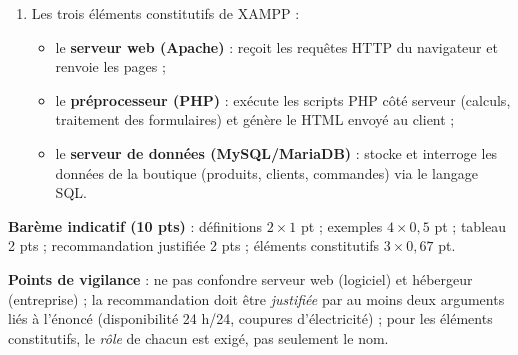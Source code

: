 \documentclass[11pt]{article}
\begin{document}
\begin{corrige}
\begin{enumerate}
\begin{itemize}
\item un hébergeur professionnel garantit une \textbf{bande passante suffisante}, une adresse IP fixe, un nom de domaine et une \textbf{sécurité} (pare-feu, sauvegardes, certificat HTTPS) difficiles à mettre en œuvre localement par une PME.
\end{itemize}
\item Les trois éléments constitutifs de XAMPP :
\begin{itemize}
\item le \textbf{serveur web (Apache)} : reçoit les requêtes HTTP du navigateur et renvoie les pages ;
\item le \textbf{préprocesseur (PHP)} : exécute les scripts PHP côté serveur (calculs, traitement des formulaires) et génère le HTML envoyé au client ;
\item le \textbf{serveur de données (MySQL/MariaDB)} : stocke et interroge les données de la boutique (produits, clients, commandes) via le langage SQL.
\end{itemize}
\end{enumerate}
\textbf{Barème indicatif (10 pts)} : définitions $2\times1$ pt ; exemples $4\times0,5$ pt ; tableau 2 pts ; recommandation justifiée 2 pts ; éléments constitutifs $3\times0,67$ pt.\par
\textbf{Points de vigilance} : ne pas confondre serveur web (logiciel) et hébergeur (entreprise) ; la recommandation doit être \emph{justifiée} par au moins deux arguments liés à l'énoncé (disponibilité 24 h/24, coupures d'électricité) ; pour les éléments constitutifs, le \emph{rôle} de chacun est exigé, pas seulement le nom.
\end{corrige}
\end{document}
